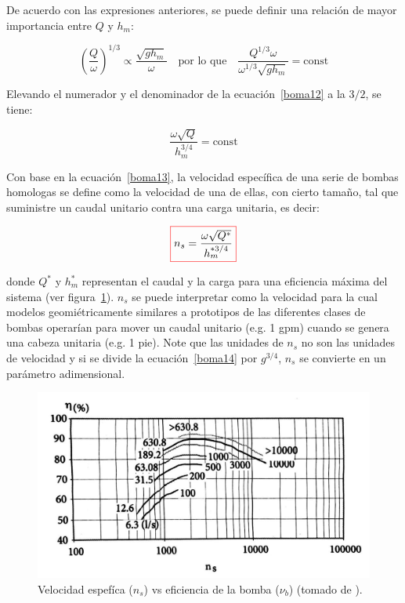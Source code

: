 \documentclass[11pt, oneside]{article}
\begin{document}
De acuerdo con las expresiones anteriores, se puede definir una relaci\'on de mayor importancia entre $Q$ y $h_m$:

\begin{equation}
\left( \frac{Q}{\omega} \right)^{1/3} \propto \frac{\sqrt{g h_m}}{\omega} \quad \text{por lo que} \quad \frac{Q^{1/3} \omega}{\omega^{1/3} \sqrt{g h_m}} = \text{const}
\label{boma12}
\end{equation}

Elevando el numerador y el denominador de la ecuaci\'on~\ref{boma12} a la $3/2$, se tiene:

\begin{equation}
 \frac{\omega \sqrt{Q}}{ h_m^{3/4}} = \text{const}
\label{boma13}
\end{equation}

Con base en la ecuaci\'on~\ref{boma13}, la velocidad espec\'ifica de una serie de bombas homologas se define como la velocidad de una de ellas, con cierto tama\~no, tal que suministre un caudal unitario contra una carga unitaria, es decir:

\begin{equation}
\color{red}\boxed{\color{black} n_s= \frac{\omega \sqrt{Q^*} }{ h_m^{*3/4}} }
\label{boma14}
\end{equation}

donde $Q^*$ y $h_m^*$ representan el caudal y la carga para una eficiencia m\'axima del sistema (ver figura~\ref{bom11}). $n_s$ se puede interpretar como la velocidad para la cual modelos geomi\'etricamente similares a prototipos de las diferentes clases de bombas operar\'ian para mover un caudal unitario (e.g. 1 gpm) cuando se genera una cabeza unitaria (e.g. 1 pie). Note que las unidades de $n_s$ no son las unidades de velocidad y si se divide la ecuaci\'on~\ref{boma14} por $g^{3/4}$, $n_s$ se convierte en un par\'ametro adimensional.

\begin{figure}[h]
\centering
\includegraphics[width=12cm]{./figs/bom11.jpeg}
\caption{Velocidad espef\'ica ($n_s$) vs eficiencia de la bomba ($\nu_b$)  (tomado de \cite{agudelo2011mecanica}).} 
\label{bom11}
\end{figure}
\end{document}
